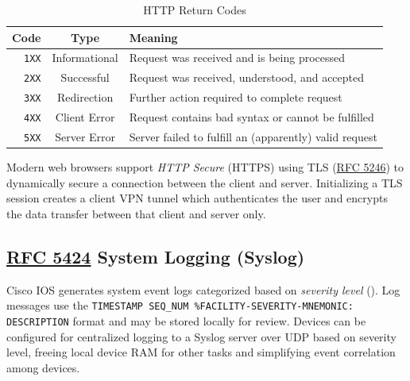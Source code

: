 \documentclass[12pt]{article}
\newcommand{\RFC}[1]{\href{https://datatracker.ietf.org/doc/html/rfc#1}{RFC #1}}
\begin{document}
	\begin{table}[H]
	\centering
	\caption{HTTP Return Codes \label{tab:HTTP CODES}}
	\begin{tabular}{r | c | l}
	\hline
	\textbf{Code}	& \textbf{Type}	& \textbf{Meaning}\\\hline
	\texttt{1XX}			& Informational			& Request was received and is being processed\\\hline
	\texttt{2XX}			& Successful			& Request was received, understood, and accepted\\\hline
	\texttt{3XX}			& Redirection			& Further action required to complete request\\\hline
	\texttt{4XX}			& Client Error			& Request contains bad syntax or cannot be fulfilled\\\hline
	\texttt{5XX}			& Server Error			& Server failed to fulfill an (apparently) valid request\\\hline
	\end{tabular}\end{table}
	Modern web browsers support \textit{HTTP Secure} (HTTPS) using TLS (\RFC{5246}) to dynamically secure a connection between the client and server. Initializing a TLS session creates a client VPN tunnel which authenticates the user and encrypts the data transfer between that client and server only.


	\subsection[RFC 5424 Syslog]{\RFC{5424} System Logging (Syslog) \label{subsec:SYSLOG}}
	Cisco IOS generates system event logs categorized based on \textit{severity level} (). Log messages use the \texttt{TIMESTAMP SEQ\_NUM \%FACILITY-SEVERITY-MNEMONIC: DESCRIPTION} format and may be stored locally for review. Devices can be configured for centralized logging to a Syslog server over UDP based on severity level, freeing local device RAM for other tasks and simplifying event correlation among devices.
\end{document}
